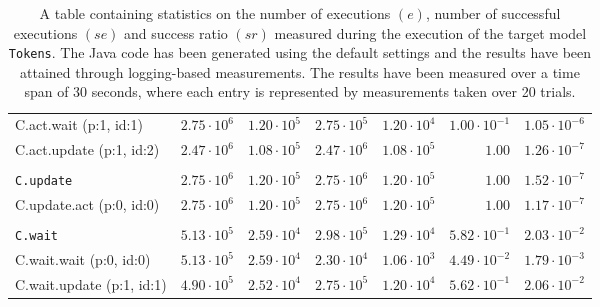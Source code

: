 \begin{table}[htbp]
{\begin{tabular}{lrrrrrr}
\hspace{3mm}C.act.wait (p:1, id:1)    & $2.75 \cdot 10^{6}$ & $1.20 \cdot 10^{5}$ & $2.75 \cdot 10^{5}$ & $1.20 \cdot 10^{4}$ & $1.00 \cdot 10^{-1}$ & $1.05 \cdot 10^{-6}$ \\
\hspace{3mm}C.act.update (p:1, id:2)  & $2.47 \cdot 10^{6}$ & $1.08 \cdot 10^{5}$ & $2.47 \cdot 10^{6}$ & $1.08 \cdot 10^{5}$ &               $1.00$ & $1.26 \cdot 10^{-7}$ \\
\\[-8pt]\texttt{C.update}             & $2.75 \cdot 10^{6}$ & $1.20 \cdot 10^{5}$ & $2.75 \cdot 10^{6}$ & $1.20 \cdot 10^{5}$ &               $1.00$ & $1.52 \cdot 10^{-7}$ \\
\hspace{3mm}C.update.act (p:0, id:0)  & $2.75 \cdot 10^{6}$ & $1.20 \cdot 10^{5}$ & $2.75 \cdot 10^{6}$ & $1.20 \cdot 10^{5}$ &               $1.00$ & $1.17 \cdot 10^{-7}$ \\
\\[-8pt]\texttt{C.wait}               & $5.13 \cdot 10^{5}$ & $2.59 \cdot 10^{4}$ & $2.98 \cdot 10^{5}$ & $1.29 \cdot 10^{4}$ & $5.82 \cdot 10^{-1}$ & $2.03 \cdot 10^{-2}$ \\
\hspace{3mm}C.wait.wait (p:0, id:0)   & $5.13 \cdot 10^{5}$ & $2.59 \cdot 10^{4}$ & $2.30 \cdot 10^{4}$ & $1.06 \cdot 10^{3}$ & $4.49 \cdot 10^{-2}$ & $1.79 \cdot 10^{-3}$ \\
\hspace{3mm}C.wait.update (p:1, id:1) & $4.90 \cdot 10^{5}$ & $2.52 \cdot 10^{4}$ & $2.75 \cdot 10^{5}$ & $1.20 \cdot 10^{4}$ & $5.62 \cdot 10^{-1}$ & $2.06 \cdot 10^{-2}$ \\
\bottomrule
\end{tabular}
}
\caption{A table containing statistics on the number of executions $(e)$, number of successful executions $(se)$ and success ratio $(sr)$ measured during the execution of the target model \texttt{Tokens}. The Java code has been generated using the default settings and the results have been attained through logging-based measurements. The results have been measured over a time span of 30 seconds, where each entry is represented by measurements taken over 20 trials.}
\label{table:frequency_results_tokens_logging}
\end{table}